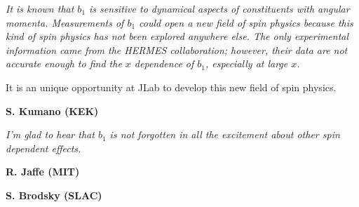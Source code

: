 \vspace{0.5cm}
\noindent
{\it 
It is known that $b_1$ is sensitive to dynamical aspects
of constituents with angular momenta. 
%
Measurements of $b_1$ could open
a new field of spin physics because this kind of spin physics has not
been explored anywhere else. The only experimental information came from
the HERMES collaboration; however, their data are not accurate enough
to find the $x$ dependence of $b_1$, especially at large $x$. 

It is an unique opportunity at JLab to develop this new field of spin physics.

}
\begin{flushright}{\bf S. Kumano (KEK)}\end{flushright}

\vspace{0.5cm}
\noindent
{\it I'm glad to hear that $b_1$ is not forgotten in all the excitement about other spin dependent 
effects.
}
\begin{flushright}{\bf R. Jaffe (MIT)}\end{flushright}

\vspace{0.5cm}
\begin{flushright}{\bf S. Brodsky (SLAC)}\end{flushright}
 
